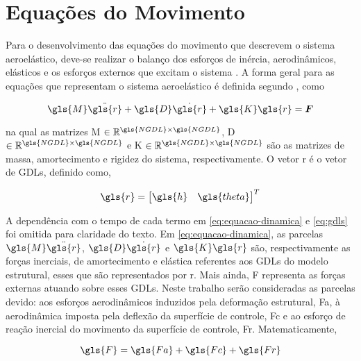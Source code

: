 \section{Equações do Movimento}\label{sec:equacoes-movimento}

Para o desenvolvimento das equações do movimento que descrevem o sistema aeroelástico, deve-se realizar o balanço dos esforços de inércia, aerodinâmicos, elásticos e os esforços externos que excitam o sistema \cite{book:Fung}. A forma geral para as equações que representam o sistema aeroelástico é definida segundo \textcite{book:Wright-Cooper}, como

\begin{equation} \label{eq:equacao-dinamica}
    \gls{M}\ddot{\gls{r}} +  \gls{D}\dot{\gls{r}} + \gls{K}\gls{r} = \boldsymbol{F}
\end{equation}

\noindent na qual as matrizes \gls{M} $\in \mathbb{R}^{\gls{NGDL} \times \gls{NGDL}}$, \gls{D} $\in \mathbb{R}^{\gls{NGDL} \times \gls{NGDL}}$ e \gls{K} $\in \mathbb{R}^{\gls{NGDL} \times \gls{NGDL}}$ são as matrizes de massa, amortecimento e rigidez do sistema, respectivamente. O vetor \gls{r} é o vetor de \gls{GDL}s, definido como,

\begin{equation} \label{eq:gdls}
    \gls{r} = \begin{bmatrix}
        \gls{h} & \gls{theta}
    \end{bmatrix}^{T}
\end{equation}

A dependência com o tempo de cada termo em \eqref{eq:equacao-dinamica} e \eqref{eq:gdls} foi omitida para claridade do texto. Em \eqref{eq:equacao-dinamica}, as parcelas $\gls{M}\ddot{\gls{r}}$, $\gls{D}\dot{\gls{r}}$ e $\gls{K}\gls{r}$ são, respectivamente as forças inerciais, de amortecimento e elástica referentes aos \gls{GDL}s do modelo estrutural, esses que são representados por \gls{r}. Mais ainda, \gls{F} representa as forças externas atuando sobre esses \gls{GDL}s. Neste trabalho serão consideradas as parcelas devido: aos esforços aerodinâmicos induzidos pela deformação estrutural, \gls{Fa}, à aerodinâmica imposta pela deflexão da superfície de controle, \gls{Fc} e ao esforço de reação inercial do movimento da superfície de controle, \gls{Fr}. Matematicamente, 

\begin{equation} \label{eq:forcas-aplicadas}
    \gls{F} = \gls{Fa} + \gls{Fc} + \gls{Fr}
\end{equation}

